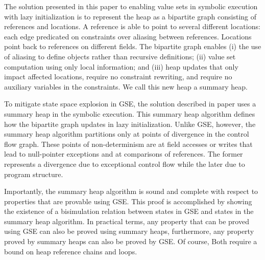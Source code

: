 
The solution presented in this paper to enabling value sets in symbolic execution
with lazy initialization is to represent the heap as a bipartite graph
consisting of references and locations. A reference is able to point
to several different locations: each edge predicated on constraints
over aliasing between references. Locations point back to references
on different fields. The bipartite graph enables (i) the use of
aliasing to define objects rather than recursive definitions; (ii)
value set computation using only local information; and (iii) heap
updates that only impact affected locations, require no constraint
rewriting, and require no auxiliary variables in the constraints.  We
call this new heap a summary heap.

To mitigate state space explosion in GSE, the solution described in
paper uses a summary heap in the symbolic execution. This summary heap
algorithm defines how the bipartite graph updates in lazy
initialization. Unlike GSE, however, the summary heap algorithm
partitions only at points of divergence in the control flow
graph. These points of non-determinism are at field accesses or writes
that lead to null-pointer exceptions and at comparisons of
references. The former represents a divergence due to exceptional
control flow while the later due to program structure.


Importantly, the summary heap algorithm is sound and complete with
respect to properties that are provable using GSE. This proof is
accomplished by showing the existence of a bisimulation relation
between states in GSE and states in the summary heap algorithm. In
practical terms, any property that can be proved using GSE can also be
proved using summary heaps, furthermore, any property proved by
summary heaps can also be proved by GSE. Of course, Both require a bound on heap
reference chains and loops.

